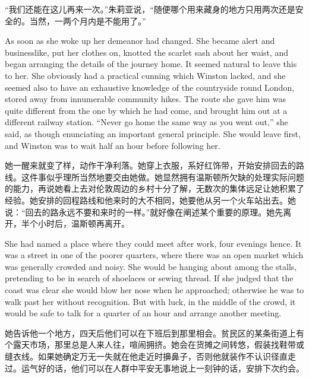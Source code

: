 \begin{paracol}{2}
\switchcolumn

``我们还能在这儿再来一次。''朱莉亚说，``随便哪个用来藏身的地方只用两次还是安全的。当然，一两个月内是不能用了。''

\switchcolumn*

As soon as she woke up her demeanor had changed. She became alert and
businesslike, put her clothes on, knotted the scarlet sash about her
waist, and began arranging the details of the journey home. It seemed
natural to leave this to her. She obviously had a practical cunning
which Winston lacked, and she seemed also to have an exhaustive
knowledge of the countryside round London, stored away from innumerable
community hikes. The route she gave him was quite different from the one
by which he had come, and brought him out at a different railway
station. ``Never go home the same way as you went out,'' she said, as
though enunciating an important general principle. She would leave
first, and Winston was to wait half an hour before following her.

\switchcolumn

她一醒来就变了样，动作干净利落。她穿上衣服，系好红饰带，开始安排回去的路线。这件事似乎理所当然地要交由她做。她显然拥有温斯顿所欠缺的处理实际问题的能力，再说她看上去对伦敦周边的乡村十分了解，无数次的集体远足让她积累了经验。她安排的回程路线和他来时的大不相同，她要他从另一个火车站出去。她说：``回去的路永远不要和来时的一样。''就好像在阐述某个重要的原理。她先离开，半个小时后，温斯顿再离开。

\switchcolumn*

She had named a place where they could meet after work, four evenings
hence. It was a street in one of the poorer quarters, where there was an
open market which was generally crowded and noisy. She would be hanging
about among the stalls, pretending to be in search of shoelaces or
sewing thread. If she judged that the coast was clear she would blow her
nose when he approached; otherwise he was to walk past her without
recognition. But with luck, in the middle of the crowd, it would be safe
to talk for a quarter of an hour and arrange another meeting.

\switchcolumn

她告诉他一个地方，四天后他们可以在下班后到那里相会。贫民区的某条街道上有个露天市场，那里总是人来人往，喧闹拥挤。她会在货摊之间转悠，假装找鞋带或缝衣线。如果她确定万无一失就在他走近时擤鼻子，否则他就装作不认识径直走过。运气好的话，他们可以在人群中平安无事地说上一刻钟的话，安排下次约会。

\switchcolumn*


\end{paracol}
